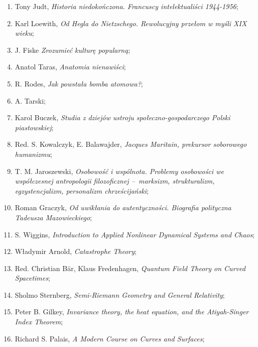 \documentclass[a4paper,11pt]{article}
\begin{document}
\begin{enumerate}
\item Tony Judt, \textit{Historia niedokończona. Francuscy
    intelektualiści 1944-1956};

\item Karl Loewith, \textit{Od Hegla do Nietzschego. Rewolucyjny przełom
    w myśli XIX wieku};

\item J. Fiske \textit{Zrozumieć kulturę popularną};

\item Anatol Taras, \textit{Anatomia nienawiści};

\item R. Rodes, \textit{Jak powstała bomba atomowa?};

\item A. Tarski;

\item Karol Buczek, \textit{Studia z dziejów ustroju
    społeczno-gospodarczego Polski piastowskiej};

\item Red. S. Kowalczyk, E. Balawajder, \textit{Jacques Maritain,
    prekursor soborowego humanizmu};

\item T. M. Jaroszewski, \textit{Osobowość i wspólnota. Problemy
    osobowości we współczesnej antropologii filozoficznej --~marksizm,
    strukturalizm, egzystencjalizm, personalizm chrześcijański};

\item Roman Graczyk, \textit{Od uwikłania do autentyczności. Biografia
    polityczna Tadeusza Mazowieckiego};

\item S. Wiggins, \textit{Introduction to Applied Nonlinear Dynamical
    Systems and Chaos};

\item Władymir Arnold, \textit{Catastrophe Theory};

\item Red. Christian B\"{a}r, Klaus Fredenhagen, \textit{Quantum Field
    Theory on Curved Spacetimes};

\item Sholmo Sternberg, \textit{Semi-Riemann Geometry and General
    Relativity};

\item Peter B. Gilkey, \textit{Invariance theory, the heat equation, and
    the Atiyah-Singer Index Theorem};

\item Richard S. Palais, \textit{A Modern Course on Curves and
    Surfaces};


\end{enumerate}
\end{document}
